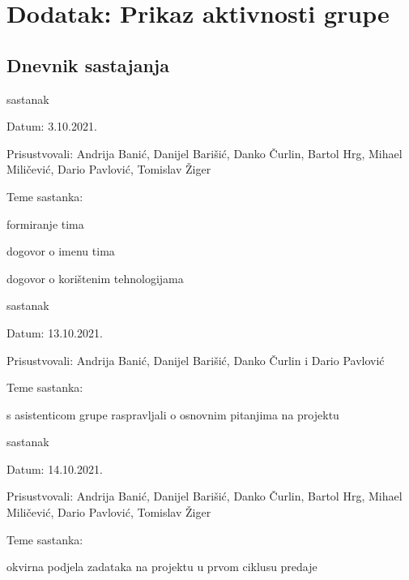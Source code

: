 \chapter*{Dodatak: Prikaz aktivnosti grupe}
		
		\section*{Dnevnik sastajanja}
		
		
		\begin{packed_enum}
			\item  sastanak
			
			\item[] \begin{packed_item}
				\item Datum: 3.10.2021.
				\item Prisustvovali: Andrija Banić, Danijel Barišić, Danko Čurlin, Bartol Hrg, Mihael Miličević, Dario Pavlović, Tomislav Žiger
				\item Teme sastanka:
				\begin{packed_item}
					\item  formiranje tima
					\item  dogovor o imenu tima
					\item  dogovor o korištenim tehnologijama
				\end{packed_item}
			\end{packed_item}
			
			\item  sastanak
			\item[] \begin{packed_item}
				\item Datum: 13.10.2021.
				\item Prisustvovali: Andrija Banić, Danijel Barišić, Danko Čurlin i Dario Pavlović
				\item Teme sastanka:
				\begin{packed_item}
					\item  s asistenticom grupe raspravljali o osnovnim pitanjima na projektu
				\end{packed_item}
			\end{packed_item}
			
			\item  sastanak
			\item[] \begin{packed_item}
				\item Datum: 14.10.2021.
				\item Prisustvovali: Andrija Banić, Danijel Barišić, Danko Čurlin, Bartol Hrg, Mihael Miličević, Dario Pavlović, Tomislav Žiger
				\item Teme sastanka:
				\begin{packed_item}
					\item  okvirna podjela zadataka na projektu u prvom ciklusu predaje
				\end{packed_item}
			\end{packed_item}
			

\end{packed_enum}
